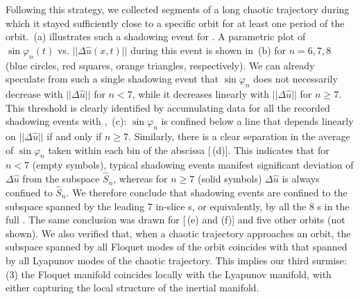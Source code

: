 Following this strategy, we collected segments of a long chaotic
trajectory during which it stayed sufficiently close to a specific orbit
for at least one period of the orbit. \,(a)
illustrates such a shadowing event for
. A parametric plot of $\sin\varphi_n(t)$ vs.
$||\Delta\hat{u}(x,t)||$ during this event is shown in
\,(b) for $n=6,7,8$ (blue circles, red squares,
orange triangles, respectively). We can already speculate from such a
single shadowing event that $\sin\varphi_n$ does not necessarily decrease
with $||\Delta\hat{u}||$ for $n<7$, while it decreases linearly with
$||\Delta\hat{u}||$ for $n\geq7$. This threshold is clearly identified by
accumulating data for all the recorded shadowing events with
, \,(c):
$\sin\varphi_n$ is confined below a line that depends linearly on
$||\Delta\hat{u}||$ if and only if $n\geq7$. Similarly, there is
a clear
separation in the average of $\sin\varphi_n$ taken within each bin of the
abscissa [\,(d)]. This indicates that for $n<7$
(empty symbols), typical shadowing events manifest significant deviation
of $\Delta\hat{u}$ from the subspace $\hat{S}_n$, whereas for $n\geq7$
(solid symbols) $\Delta\hat{u}$ is always confined to $\hat{S}_n$. We
therefore conclude that shadowing events are confined to the subspace
spanned by the leading 7 in-slice \Fv s, or equivalently, by
all the 8 {\entangled} \Fv s in the full \statesp. The
same conclusion was drawn for 
[\,(e) and (f)] and five other orbits
(not shown). We also verified that, when a chaotic trajectory approaches
an orbit, the subspace spanned by all {\entangled} Floquet modes of the
orbit coincides with that spanned by all {\entangled} Lyapunov modes of
the chaotic trajectory. This implies our third surmise: (3) the {\entangled}
Floquet manifold coincides locally with the {\entangled} Lyapunov
manifold, with either capturing the local structure of the inertial
manifold.

